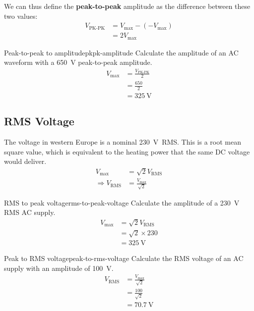 We can thus define the \textbf{peak-to-peak} amplitude as the difference between these two values:
\begin{align}
  V_{\mbox{PK-PK}} & = V_{\mbox{max}} - ( - V_{\mbox{max}} ) \\
                   & = 2 V_{\mbox{max}}                    
\end{align}

\begin{example}{Peak-to-peak to amplitude}{pkpk-amplitude}
  Calculate the amplitude of an AC waveform with a \SI{650}{\volt} peak-to-peak amplitude.
  \tcblower
  \begin{align}
    V_{\mbox{max}} & = \frac{V_{\mbox{PK-PK}}}{2} \\
                   & = \frac{650}{2} \\
                   & = \SI{325}{\volt} 
  \end{align}
\end{example}

\subsection{RMS Voltage}
\label{sec:rms-voltage}

The voltage in western Europe is a nominal \SI{230}{\volt}~RMS.
This is a root mean square value, which is equivalent to the heating power that the same DC voltage would deliver.
\begin{align}
  V_{\mbox{max}} & = \sqrt{2} V_{\mbox{RMS}} \\
  \Rightarrow V_{\mbox{RMS}} & = \frac{V_{\mbox{max}}}{\sqrt{2}}
\end{align}

\begin{example}{RMS to peak voltage}{rms-to-peak-voltage}
  Calculate the amplitude of a \SI{230}{\volt} RMS AC supply.
  \tcblower
  \begin{align}
    V_{\mbox{max}} & = \sqrt{2} V_{\mbox{RMS}} \\
                   & = \sqrt{2} \times 230 \\
                   & = \SI{325}{\volt}                    
  \end{align}
\end{example}

\begin{example}{Peak to RMS voltage}{peak-to-rms-voltage}
  Calculate the RMS voltage of an AC supply with an amplitude of \SI{100}{\volt}.
  \tcblower
  \begin{align}
    V_{\mbox{RMS}} & = \frac{V_{\mbox{max}}}{\sqrt{2}} \\
                   & = \frac{100}{\sqrt{2}} \\
                   & = \SI{70.7}{\volt} 
  \end{align}
\end{example}

